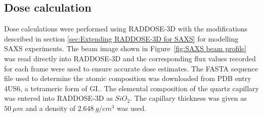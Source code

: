 \subsection{Dose calculation}
\label{sub:Dose calculation}
Dose calculations were performed using RADDOSE-3D with the modifications described in section \ref{sec:Extending RADDOSE-3D for SAXS} for modelling SAXS experiments.
The beam image shown in Figure~\ref{fig:SAXS beam profile} was read directly into RADDOSE-3D and the corresponding flux values recorded for each frame were used to ensure accurate dose estimates.
The FASTA sequence file used to determine the atomic composition was downloaded from PDB entry 4US6, a tetrameric form of GI..
The elemental composition of the quartz capillary was entered into RADDOSE-3D as $SiO_2$.
The capillary thickness was given as $50\ \mu m$ and a density of $2.648\ g/cm^3$ was used.
